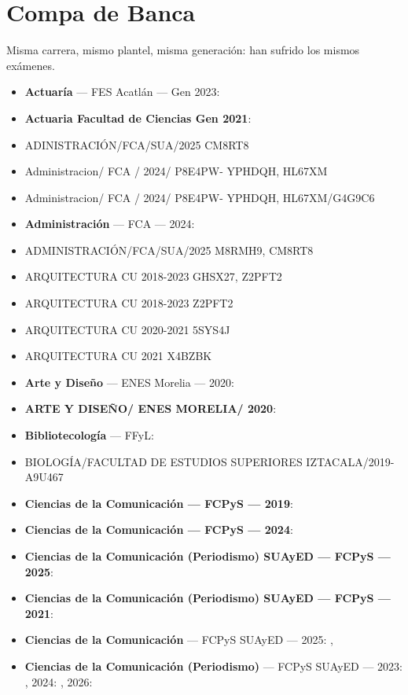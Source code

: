 \section{Compa de Banca}
Misma carrera, mismo plantel, misma generación: han sufrido los mismos exámenes.
\begin{itemize}[leftmargin=*]
  \item \textbf{Actuaría} --- FES Acatlán --- Gen 2023: 
  \item \textbf{Actuaria Facultad de Ciencias Gen 2021}: 
  \item ADINISTRACIÓN/FCA/SUA/2025 CM8RT8
  \item Administracion/ FCA / 2024/ P8E4PW- YPHDQH, HL67XM
  \item Administracion/ FCA / 2024/ P8E4PW- YPHDQH, HL67XM/G4G9C6
  \item \textbf{Administración} --- FCA --- 2024: 
  \item ADMINISTRACIÓN/FCA/SUA/2025 M8RMH9, CM8RT8
  \item ARQUITECTURA CU 2018-2023 GHSX27, Z2PFT2
  \item ARQUITECTURA CU 2018-2023 Z2PFT2
  \item ARQUITECTURA CU 2020-2021 5SYS4J
  \item ARQUITECTURA CU 2021 X4BZBK
  \item \textbf{Arte y Diseño} --- ENES Morelia --- 2020: 
  \item \textbf{ARTE Y DISEÑO/ ENES MORELIA/ 2020}: 
  \item \textbf{Bibliotecología} --- FFyL: 
  \item BIOLOGÍA/FACULTAD DE ESTUDIOS SUPERIORES IZTACALA/2019- A9U467
  \item \textbf{Ciencias de la Comunicación --- FCPyS --- 2019}: 
  \item \textbf{Ciencias de la Comunicación --- FCPyS --- 2024}: 
  \item \textbf{Ciencias de la Comunicación (Periodismo) SUAyED --- FCPyS --- 2025}: 
  \item \textbf{Ciencias de la Comunicación (Periodismo) SUAyED --- FCPyS --- 2021}: 
  \item \textbf{Ciencias de la Comunicación} --- FCPyS SUAyED --- 2025: , 
  \item \textbf{Ciencias de la Comunicación (Periodismo)} --- FCPyS SUAyED --- 2023: , 2024: , 2026: 

\end{itemize}
